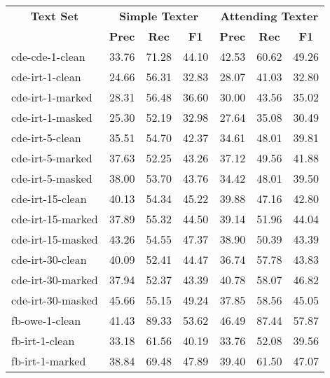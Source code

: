 \begin{tabular}{| l | r | r | r | r | r | r |}
    \hline

    \multicolumn{1}{|c|}{\textbf{Text Set}} &
    \multicolumn{3}{|c|}{\textbf{Simple Texter}}
    &
    \multicolumn{3}{|c|}{\textbf{Attending Texter}}
    \\

    \multicolumn{1}{|c|}{} &
    \multicolumn{1}{|c|}{\textbf{Prec}} &
    \multicolumn{1}{|c|}{\textbf{Rec}}
    &
    \multicolumn{1}{|c|}{\textbf{F1}}
    &
    \multicolumn{1}{|c|}{\textbf{Prec}}
    &
    \multicolumn{1}{|c|}{\textbf{Rec}}
    &
    \multicolumn{1}{|c|}{\textbf{F1}}
    \\

    \hline \hline

    cde-cde-1-clean   & 33.76 & 71.28 & 44.10 & 42.53 & 60.62 & 49.26 \\ \hline
    cde-irt-1-clean   & 24.66 & 56.31 & 32.83 & 28.07 & 41.03 & 32.80 \\
    cde-irt-1-marked  & 28.31 & 56.48 & 36.60 & 30.00 & 43.56 & 35.02 \\
    cde-irt-1-masked  & 25.30 & 52.19 & 32.98 & 27.64 & 35.08 & 30.49 \\ \hline
    cde-irt-5-clean   & 35.51 & 54.70 & 42.37 & 34.61 & 48.01 & 39.81 \\
    cde-irt-5-marked  & 37.63 & 52.25 & 43.26 & 37.12 & 49.56 & 41.88 \\
    cde-irt-5-masked  & 38.00 & 53.70 & 43.76 & 34.42 & 48.01 & 39.50 \\ \hline
    cde-irt-15-clean  & 40.13 & 54.34 & 45.22 & 39.88 & 47.16 & 42.80 \\
    cde-irt-15-marked & 37.89 & 55.32 & 44.50 & 39.14 & 51.96 & 44.04 \\
    cde-irt-15-masked & 43.26 & 54.55 & 47.37 & 38.90 & 50.39 & 43.39 \\ \hline
    cde-irt-30-clean  & 40.09 & 52.41 & 44.47 & 36.74 & 57.78 & 43.83 \\
    cde-irt-30-marked & 37.94 & 52.37 & 43.39 & 40.78 & 58.07 & 46.82 \\
    cde-irt-30-masked & 45.66 & 55.15 & 49.24 & 37.85 & 58.56 & 45.05 \\ \hline \hline
    fb-owe-1-clean    & 41.43 & 89.33 & 53.62 & 46.49 & 87.44 & 57.87 \\ \hline
    fb-irt-1-clean    & 33.18 & 61.56 & 40.19 & 33.76 & 52.08 & 39.56 \\
    fb-irt-1-marked   & 38.84 & 69.48 & 47.89 & 39.40 & 61.50 & 47.07 \\

\end{tabular}
